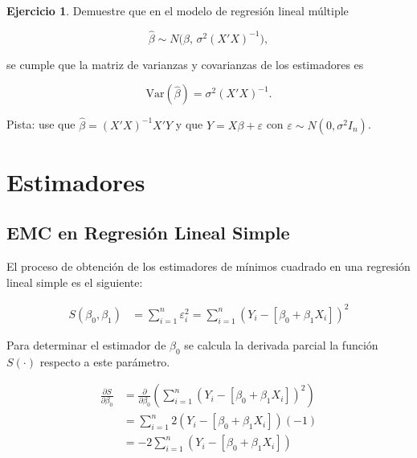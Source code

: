 \documentclass[
  11pt,
]{book}
\theoremstyle{definition}
\theoremstyle{definition}
\theoremstyle{definition}
\newtheorem{exercise}{Ejercicio}[chapter]
\theoremstyle{definition}
\theoremstyle{remark}
\begin{document}
\begin{exercise}
Demuestre que en el modelo de regresión lineal múltiple

\[
\hat{\beta} \sim N\!\big(\beta, \, \sigma^2 (X'X)^{-1}\big),
\]

se cumple que la matriz de varianzas y covarianzas de los estimadores es

\[
\mathrm{Var}(\hat{\beta}) = \sigma^2 (X'X)^{-1}.
\]

Pista: use que \(\hat{\beta} = (X'X)^{-1}X'Y\) y que \(Y = X\beta + \varepsilon\) con \(\varepsilon \sim N(0, \sigma^2 I_n)\).
\end{exercise}

\appendix {}


\chapter{Estimadores}\label{estimadores}

\section{EMC en Regresión Lineal Simple}\label{RLS-EMC}

El proceso de obtención de los estimadores de mínimos cuadrado en una regresión lineal simple es el siguiente:

\begin{equation}
\begin{split}
S(\beta_0,\beta_1) &= \sum_{i=1}^n\varepsilon_i^2 = \sum_{i=1}^n (Y_i - [\beta_0 + \beta_1X_i])^2
\end{split}
\label{eq:betasestimador-demostracion}
\end{equation}

Para determinar el estimador de \(\beta_0\) se calcula la derivada parcial la función \(S(\cdot)\) respecto a este parámetro.

\begin{equation}
\begin{split}
\frac{\partial S}{\partial\beta_0} &= \frac{\partial }{\partial\beta_0}\left(\sum_{i=1}^n (Y_i - [\beta_0 + \beta_1X_i])^2\right)\\
&= \sum_{i=1}^n 2(Y_i - [\beta_0 + \beta_1X_i])(-1)\\
&= -2\sum_{i=1}^n (Y_i - [\beta_0 + \beta_1X_i])\\
\end{split}
\label{eq:beta0estimador-demostracion1}
\end{equation}
\end{document}
